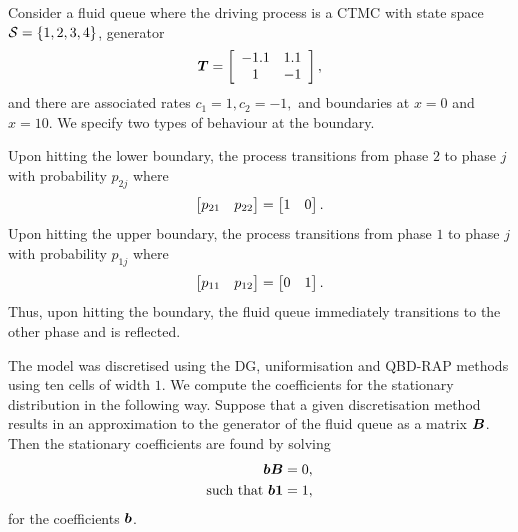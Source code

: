 

\begin{model}\label{model: simple}
	Consider a fluid queue where the driving process is a CTMC with state space \(\mathcal{S}=\{1,2,3,4\}\), generator 
	\[\boldsymbol T = \left[\begin{array}{cccc}
		-1.1 & 1.1 \\
		1 & -1 \\ 
	\end{array}\right],\]
	and there are associated rates \(c_1=1, c_2 = -1,\) and boundaries at \(x=0\) and \(x=10\). We specify two types of behaviour at the boundary.
	
	Upon hitting the lower boundary, the process transitions from phase \(2\) to phase \(j\) with probability \(p_{2j}\) where 
		\[\begin{bmatrix} p_{21} & p_{22}  \end{bmatrix} = \begin{bmatrix} 1 & 0 \end{bmatrix}.\]
		Upon hitting the upper boundary, the process transitions from phase \(1\) to phase \(j\) with probability \(p_{1j}\) where 
		\[\begin{bmatrix} p_{11} & p_{12}  \end{bmatrix} = \begin{bmatrix} 0 & 1 \end{bmatrix}.\]
	Thus, upon hitting the boundary, the fluid queue immediately transitions to the other phase and is reflected.
\end{model}

The model was discretised using the DG, uniformisation and QBD-RAP methods using ten cells of width \(1\). We compute the coefficients for the stationary distribution in the following way. Suppose that a given discretisation method results in an approximation to the generator of the fluid queue as a matrix \(\boldsymbol B\). Then the stationary coefficients are found by solving 
\begin{align}
	\boldsymbol b \boldsymbol B = 0,\\
	\mbox{such that } \boldsymbol b\boldsymbol 1=1,
\end{align}
for the coefficients \(\boldsymbol b\). 

